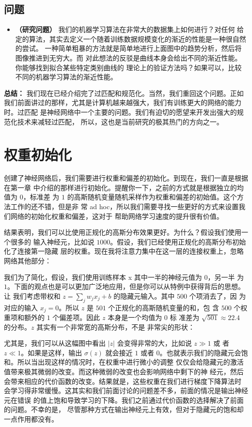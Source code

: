 \subsection*{问题}

\begin{itemize}
\item \textbf{（研究问题）} 我们的机器学习算法在非常大的数据集上如何进行？对任何
  给定的算法，其实去定义一个随着训练数据规模变化的渐近的性能是一种很自然的尝试。
  一种简单粗暴的方法就是简单地进行上面图中的趋势分析，然后将图像推进到无穷大。而
  对此想法的反驳是曲线本身会给出不同的渐近性能。你能够找到拟合某些特定类别曲线的
  理论上的验证方法吗？如果可以，比较不同的机器学习算法的渐近性能。
\end{itemize}

\textbf{总结：} 我们现在已经介绍完了过匹配和规范化。当然，我们重回这个问题。正如
我们前面讲过的那样，尤其是计算机越来越强大，我们有训练更大的网络的能力时。过匹配
是神经网络中一个主要的问题。我们有迫切的愿望来开发出强大的规范化技术来减轻过匹配，
所以，这也是当前研究的极其热门的方向之一。

\section{权重初始化}
\label{sec:weight_initialization}

创建了神经网络后，我们需要进行权重和偏差的初始化。到现在，我们一直是根据在第一章
中介绍的那样进行初始化。提醒你一下，之前的方式就是根据独立的均值为 $0$，标准差
为 $1$ 的高斯随机变量随机采样作为权重和偏差的初始值。这个方法工作的还不错，但是非
常 ad hoc，所以我们需要寻找一些更好的方式来设置我们网络的初始化权重和偏差，这对于
帮助网络学习速度的提升很有价值。

结果表明，我们可以比使用正规化的高斯分布效果更好。为什么？假设我们使用一个很多的
输入神经元，比如说 $1000$。假设，我们已经使用正规化的高斯分布初始化了连接第一隐藏
层的权重。现在我将注意力集中在这一层的连接权重上，忽略网络其他部分：

我们为了简化，假设，我们使用训练样本 x 其中一半的神经元值为 $0$，另一半
为 $1$。下面的观点也是可以更加广泛地应用，但是你可以从特例中获得背后的思想。让
我们考虑带权和 $z=\sum_j w_j x_j + b$ 的隐藏元输入。其中 $500$ 个项消去了，因
为对应的输入 $x_j=0$。所以 $z$ 是 $501$ 个正规化的高斯随机变量的和，包
含 $500$ 个权重项和额外的 $1$ 个偏差项。因此 $z$ 本身是一个均值为 $0$ 标
准差为 $\sqrt{501}\approx 22.4$ 的分布。$z$ 其实有一个非常宽的高斯分布，不是
非常尖的形状：

尤其是，我们可以从这幅图中看出 $|z|$ 会变得非常的大，比如说 $z\gg1$ 或
者 $z\ll 1$。如果是这样，输出 $\sigma(z)$ 就会接近 $1$ 或者
$0$。也就表示我们的隐藏元会饱和。所以当出现这样的情况时，在权重中进行微小的调整
仅仅会给隐藏元的激活值带来极其微弱的改变。而这种微弱的改变也会影响网络中剩下的神
经元，然后会带来相应的代价函数的改变。结果就是，这些权重在我们进行梯度下降算法时
会学习得非常缓慢。这其实和我们前面讨论的问题差不多，前面的情况是输出神经元在错误
的值上饱和导致学习的下降。我们之前通过代价函数的选择解决了前面的问题。不幸的是，
尽管那种方式在输出神经元上有效，但对于隐藏元的饱和却一点作用都没有。

